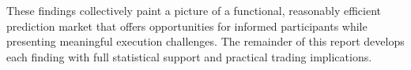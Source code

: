 These findings collectively paint a picture of a functional, reasonably efficient prediction market that offers opportunities for informed participants while presenting meaningful execution challenges. The remainder of this report develops each finding with full statistical support and practical trading implications.
